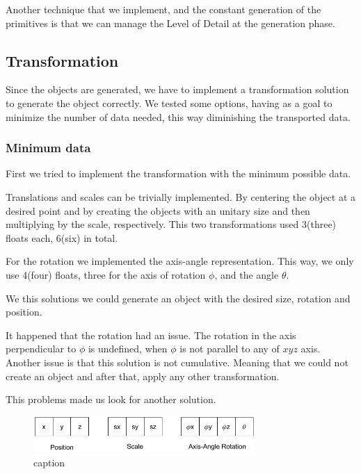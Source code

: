 Another technique that we implement, and the constant generation of the primitives is that we can manage the Level of Detail at the generation phase.




\subsection{Transformation} %
\label{sub:transformation}

Since the objects are generated, we have to implement a transformation solution to generate the object correctly. We tested some options, having as a goal to minimize the number of data needed, this way diminishing the transported data.

\subsubsection{Minimum data} %
\label{ssub:minimum_data}

First we tried to implement the transformation with the minimum possible data.

Translations and scales can be trivially implemented. By centering the object at a desired point and by creating the objects with an unitary size and then multiplying by the scale, respectively. This two transformations used 3(three) floats each, 6(six) in total. 

For the rotation we implemented the axis-angle representation\cite{curtright2014compact}. This way, we only use 4(four) floats, three for the axis of rotation $\phi$, and the angle $\theta$.

We this solutions we could generate an object with the desired size, rotation and position. 

It happened that the rotation had an issue. The rotation in the axis perpendicular to $\phi$ is undefined, when $\phi$ is not parallel to any of $xyz$ axis. 
Another issue is that this solution is not cumulative. Meaning that we could not create an object and after that, apply any other transformation.

This problems made us look for another solution.

\begin{figure}[h!]
	\centering
	\includegraphics[width=0.75\textwidth]{images/solution/Axis-Angle_Representation.png}
	\caption{caption}
	\label{fig:axis_angle}
\end{figure}

